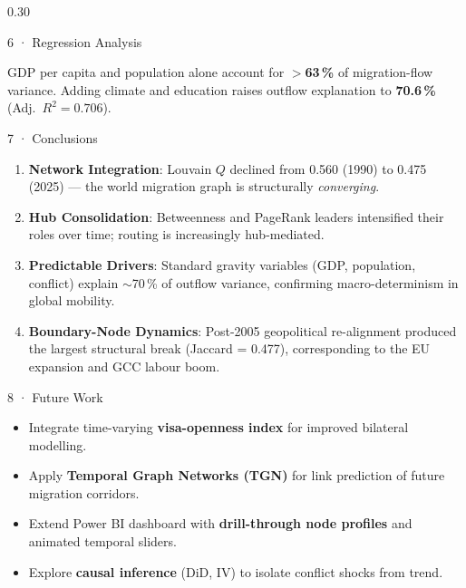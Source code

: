 \documentclass[final]{beamer}
\newcommand{\keybox}[2]{%
  \begin{tcolorbox}[
      enhanced,
      colback=NavyBlue!8,
      colframe=AccentRed,
      leftrule=4pt, rightrule=0pt, toprule=0pt, bottomrule=0pt,
      boxsep=4pt, left=6pt, right=6pt,
      title={\bfseries\color{AccentRed} #1},
      fonttitle=\normalsize,
      coltitle=AccentRed,
      attach boxed title to top left={yshift=-2mm,xshift=6pt},
      boxed title style={colback=white,colframe=AccentRed,
                         leftrule=0pt,rightrule=0pt,
                         toprule=0pt,bottomrule=0pt}
    ]
    #2
  \end{tcolorbox}%
}
\begin{document}
\begin{frame}[t,fragile]
\begin{columns}[T]
\begin{column}{0.30\textwidth}
\begin{block}{6 · Regression Analysis}
    \keybox{Key Finding}{%
      GDP per capita and population alone account for
      \textbf{$>$63\,\%} of migration-flow variance.
      Adding climate and education raises outflow explanation
      to \textbf{70.6\,\%} (Adj.~$R^2=0.706$).
    }

  \end{block}

  \begin{block}{7 · Conclusions}
    \begin{enumerate}
      \item \textbf{Network Integration}: Louvain $Q$ declined
            from 0.560 (1990) to 0.475 (2025) — the world
            migration graph is structurally \emph{converging}.
      \item \textbf{Hub Consolidation}: Betweenness and
            PageRank leaders intensified their roles over time;
            routing is increasingly hub-mediated.
      \item \textbf{Predictable Drivers}: Standard gravity
            variables (GDP, population, conflict) explain
            $\sim$70\,\% of outflow variance, confirming
            macro-determinism in global mobility.
      \item \textbf{Boundary-Node Dynamics}: Post-2005
            geopolitical re-alignment produced the largest
            structural break (Jaccard = 0.477), corresponding
            to the EU expansion and GCC labour boom.
    \end{enumerate}
  \end{block}

  \begin{block}{8 · Future Work}
    \begin{itemize}
      \item Integrate time-varying \textbf{visa-openness index}
            for improved bilateral modelling.
      \item Apply \textbf{Temporal Graph Networks (TGN)} for
            link prediction of future migration corridors.
      \item Extend Power BI dashboard with \textbf{drill-through
            node profiles} and animated temporal sliders.
      \item Explore \textbf{causal inference} (DiD, IV) to
            isolate conflict shocks from trend.
    \end{itemize}
  \end{block}


\end{column}
\end{columns}
\end{frame}
\end{document}
